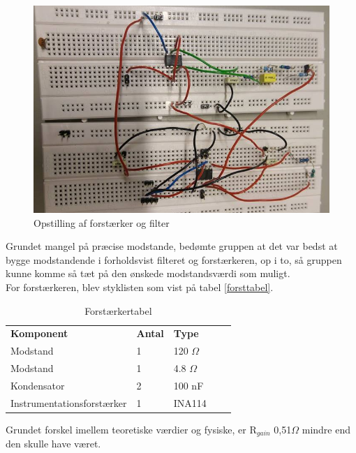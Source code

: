 \begin{figure}[H]
	\centering
	\includegraphics[width=1\textwidth]{Figurer/Hardware/samletopstilling}
	\caption{Opstilling af forstærker og filter}
	\label{samletopbygning}
\end{figure}

Grundet mangel på præcise modstande, bedømte gruppen at det var bedst at bygge modstandende i forholdsvist filteret og forstærkeren, op i to, så gruppen kunne komme så tæt på den ønskede modstandsværdi som muligt. \\
For forstærkeren, blev styklisten som vist på tabel \ref{forsttabel}.


\begin{table}[H]
\centering
\begin{tabular}{lllll}
\textbf{Komponent} & \textbf{Antal} & \textbf{Type}  &  &  \\ \cline{1-3}
Modstand           & 1              & 120 $\Omega$   &  &  \\ \cline{1-3}
Modstand           & 1              & 4.8 $\Omega$   &  &  \\ \cline{1-3}
Kondensator        & 2              & 100 nF         &  &  \\ \cline{1-3}
Instrumentationsforstærker &    1   & INA114		     &  &  \\ \cline{1-3}
\end{tabular}
\caption{Forstærkertabel}
\label{Forsttabel}
\end{table}

Grundet forskel imellem teoretiske værdier og fysiske, er R$_{gain}$ 0,51$\Omega$ mindre end den skulle have været.\\

